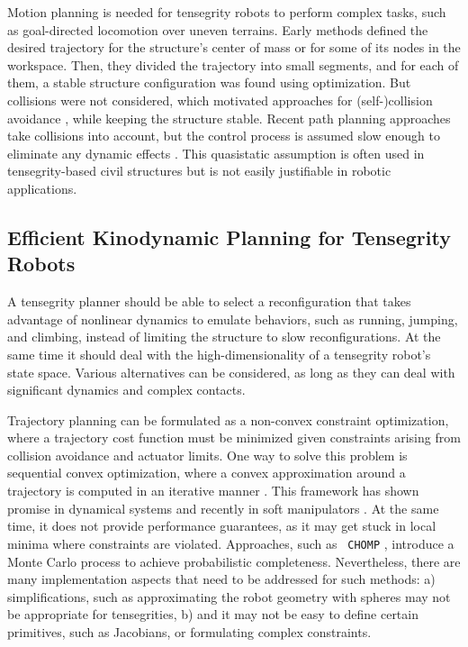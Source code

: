 Motion planning is needed for tensegrity robots to perform complex
tasks, such as goal-directed locomotion over uneven terrains.  Early
methods defined the desired trajectory for the structure's center of
mass \cite{Pinaud2003Path-Planning-f} or for some of its nodes
\cite{Wijdeven:2005dz} in the workspace.  Then, they divided the
trajectory into small segments, and for each of them, a stable
structure configuration was found using optimization.  But collisions
were not considered, which motivated approaches for (self-)collision
avoidance \cite{Xu2013Collision-free-, hernandez2009reconfigurable},
while keeping the structure stable. Recent path planning approaches
take collisions into account, but the control process is assumed slow
enough to eliminate any dynamic effects \cite{Xu2013Collision-free-,
Porta:2015aa}. This quasistatic assumption is often used in
tensegrity-based civil structures \cite{Rhode-Barbarigos:2012fv} but
is not easily justifiable in robotic applications.

\subsection{Efficient Kinodynamic Planning for Tensegrity Robots}

A tensegrity planner should be able to select a reconfiguration that
takes advantage of nonlinear dynamics to emulate behaviors, such as
running, jumping, and climbing, instead of limiting the structure to
slow reconfigurations. At the same time it should deal with the
high-dimensionality of a tensegrity robot's state space. Various
alternatives can be considered, as long as they can deal with
significant dynamics and complex contacts.

Trajectory planning can be formulated as a non-convex constraint
optimization, where a trajectory cost function must be minimized given
constraints arising from collision avoidance and actuator limits.  One
way to solve this problem is sequential convex optimization, where a
convex approximation around a trajectory is computed in an iterative
manner \cite{Schulman:2014aa}. This framework has shown promise in
dynamical systems \cite{Schulman:2014aa} and recently in soft
manipulators \cite{Marchese:2016aa}. At the same time, it does not
provide performance guarantees, as it may get stuck in local minima
where constraints are violated. Approaches, such as {\tt
CHOMP} \cite{Zucker:2013aa}, introduce a Monte Carlo process to
achieve probabilistic completeness. Nevertheless, there are many
implementation aspects that need to be addressed for such methods: a)
simplifications, such as approximating the robot geometry with spheres
may not be appropriate for tensegrities, b) and it may not be easy to
define certain primitives, such as Jacobians, or formulating complex
constraints.

